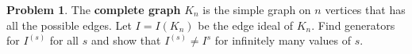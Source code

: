 \documentclass[11pt]{article}
\theoremstyle{definition}
\newtheorem{problem}{Problem}
\begin{document}
%


\begin{problem}
	The {\bf complete graph} $K_n$ is the simple graph on $n$ vertices that has all the possible edges. Let $I = I(K_n)$ be the edge ideal of $K_n$. Find generators for $I^{(s)}$ for all $s$ and show that $I^{(s)} \neq I^s$ for infinitely many values of $s$.
\end{problem}
\end{document}
